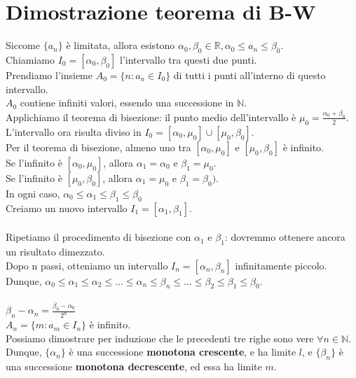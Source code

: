 \documentclass{article}
\begin{document}
\section{Dimostrazione teorema di B-W}
Siccome \(\{a_n\}\) è limitata, allora esistono \(\alpha_0, \beta_0 \in \mathbb{R}, \alpha_0 \leq a_n \leq \beta_0\).\\
Chiamiamo \(I_0 = [\alpha_0, \beta_0]\) l'intervallo tra questi due punti.\\
Prendiamo l'insieme \(A_0 = \{n : a_n \in I_0\}\) di tutti i punti all'interno di questo intervallo.\\
\(A_0\) contiene infiniti valori, essendo una successione in \(\mathbb{N}\).\\
Applichiamo il teorema di bisezione: il punto medio dell'intervallo è \(\mu_0 = \frac{\alpha_0 + \beta_0}{2}\).\\
L'intervallo ora risulta diviso in \(I_0 = [\alpha_0, \mu_0] \cup [\mu_0, \beta_0]\).\\
Per il teorema di bisezione, almeno uno tra \([\alpha_0, \mu_0]\) e \([\mu_0, \beta_0]\) è infinito.\\
Se l'infinito è \([\alpha_0, \mu_0]\), allora \(\alpha_1 = \alpha_0\) e \(\beta_1 = \mu_0\).\\
Se l'infinito è \([\mu_0, \beta_0]\), allora \(\alpha_1 = \mu_0\) e \(\beta_1 = \beta_0)\).\\
In ogni caso, \(\alpha_0 \leq \alpha_1 \leq \beta_1 \leq \beta_0\)\\
Creiamo un nuovo intervallo \(I_1 = [\alpha_1, \beta_1]\).\\\\
Ripetiamo il procedimento di bisezione con \(\alpha_1\) e \(\beta_1\): dovremmo ottenere ancora un risultato dimezzato.\\
Dopo n passi, otteniamo un intervallo \(I_n = [\alpha_n, \beta_n]\) infinitamente piccolo.\\
Dunque, \(\alpha_0 \leq \alpha_1 \leq \alpha_2 \leq \dots \leq \alpha_n \leq \beta_n \leq \dots \leq \beta_2 \leq \beta_1 \leq \beta_0\).\\\\
\(\beta_n - \alpha_n = \frac{\beta_0 - \alpha_0}{2^n}\)\\
\(A_n = \{m : a_m \in I_n\}\) è infinito.\\
Possiamo dimostrare per induzione che le precedenti tre righe sono vere \(\forall n \in \mathbb{N}\).
Dunque, \(\{\alpha_n\}\) è una successione \textbf{monotona crescente}, e ha limite \(l\), e \(\{\beta_n\}\) è una successione \textbf{monotona decrescente}, ed essa ha limite \(m\).\\\\
\end{document}

